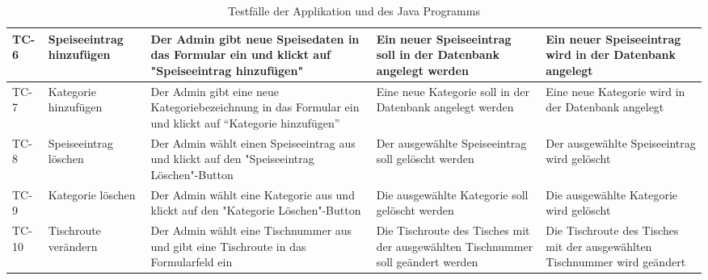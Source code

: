 \begin{table}[H]
\centering
\begin{tabular}{|p{1cm}|p{3cm}|p{3cm}|p{3cm}|p{3cm}|}
\hline TC-6 & Speiseeintrag hinzufügen & Der Admin gibt neue Speisedaten in das Formular ein und klickt auf "Speiseeintrag hinzufügen" & Ein neuer Speiseeintrag soll in der Datenbank angelegt werden & Ein neuer Speiseeintrag wird in der Datenbank angelegt \\\hline
\hline TC-7 & Kategorie hinzufügen & Der Admin gibt eine neue Kategoriebezeichnung in das Formular ein und klickt auf “Kategorie hinzufügen” & Eine neue Kategorie soll in der Datenbank angelegt werden & Eine neue Kategorie wird in der Datenbank angelegt \\\hline
\hline TC-8 & Speiseeintrag löschen & Der Admin wählt einen Speiseeintrag aus und klickt auf den "Speiseeintrag Löschen"-Button & Der ausgewählte Speiseeintrag soll gelöscht werden & Der ausgewählte Speiseeintrag wird gelöscht \\\hline
\hline TC-9 & Kategorie löschen & Der Admin wählt eine Kategorie aus und klickt auf den "Kategorie Löschen"-Button & Die ausgewählte Kategorie soll gelöscht werden & Die ausgewählte Kategorie wird gelöscht \\\hline
\hline TC-10 & Tischroute verändern & Der Admin wählt eine Tischnummer aus und gibt eine Tischroute in das Formularfeld ein & Die Tischroute des Tisches mit der ausgewählten Tischnummer soll geändert werden & Die Tischroute des Tisches mit der ausgewählten Tischnummer wird geändert \\\hline
\end{tabular}
\caption{Testfälle der Applikation und des Java Programms}
\end{table}

